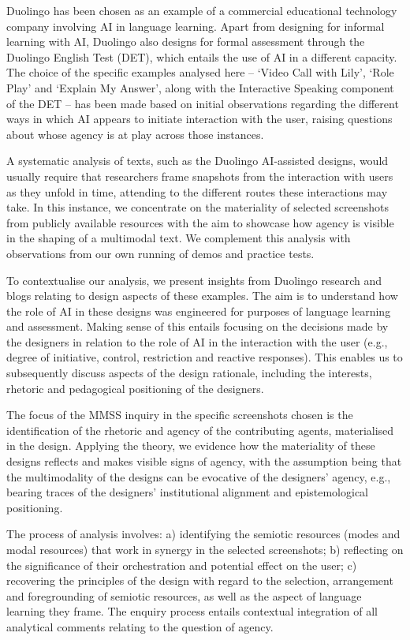 \documentclass[english]{textolivre}
\begin{document}
Duolingo has been chosen as an example of a commercial educational technology company involving AI in language learning. Apart from designing for informal learning with AI, Duolingo also designs for formal assessment through the Duolingo English Test (DET), which entails the use of AI in a different capacity. The choice of the specific examples analysed here – ‘Video Call with Lily’, ‘Role Play’ and ‘Explain My Answer’, along with the Interactive Speaking component of the DET – has been made based on initial observations regarding the different ways in which AI appears to initiate interaction with the user, raising questions about whose agency is at play across those instances.

A systematic analysis of texts, such as the Duolingo AI-assisted designs, would usually require that researchers frame snapshots from the interaction with users as they unfold in time, attending to the different routes these interactions may take. In this instance, we concentrate on the materiality of selected screenshots from publicly available resources with the aim to showcase how agency is visible in the shaping of a multimodal text. We complement this analysis with observations from our own running of demos and practice tests.

To contextualise our analysis, we present insights from Duolingo research and blogs relating to design aspects of these examples. The aim is to understand how the role of AI in these designs was engineered for purposes of language learning and assessment. Making sense of this entails focusing on the decisions made by the designers in relation to the role of AI in the interaction with the user (e.g., degree of initiative, control, restriction and reactive responses). This enables us to subsequently discuss aspects of the design rationale, including the interests, rhetoric and pedagogical positioning of the designers.

The focus of the MMSS inquiry in the specific screenshots chosen is the identification of the rhetoric and agency of the contributing agents, materialised in the design. Applying the theory, we evidence how the materiality of these designs reflects and makes visible signs of agency, with the assumption being that the multimodality of the designs can be evocative of the designers’ agency, e.g., bearing traces of the designers’ institutional alignment and epistemological positioning.

The process of analysis involves: a) identifying the semiotic resources (modes and modal resources) that work in synergy in the selected screenshots; b) reflecting on the significance of their orchestration and potential effect on the user; c) recovering the principles of the design with regard to the selection, arrangement and foregrounding of semiotic resources, as well as the aspect of language learning they frame. The enquiry process entails contextual integration of all analytical comments relating to the question of agency.
\end{document}
